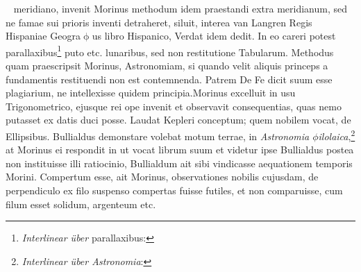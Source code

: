 \rightmoon\  meridiano\protect{}, invenit Morinus\protect{} methodum idem praestandi extra meridianum\protect{}, sed ne famae sui prioris inventi detraheret, siluit, interea  van Langren\protect{} Regis Hispaniae\protect{} Geogra$\upphi$us libro Hispanico, Verdat  idem dedit. In eo careri potest parallaxibus\protect{}\footnote{\textit{Interlinear \"{u}ber} parallaxibus: \Denarius} puto etc. lunaribus, sed non restitutione Tabularum. Methodus quam praescripsit Morinus\protect{}, Astronomiam, si quando velit aliquis princeps a fundamentis restituendi non est contemnenda. Patrem De Fe\protect{} dicit suum esse plagiarium, ne intellexisse quidem principia.\pend \pstart Morinus\protect{} excelluit in usu Trigonometrico, ejusque rei ope invenit et observavit consequentias, quas nemo putasset ex datis duci posse. Laudat Kepleri\protect{} conceptum; quem nobilem vocat, de Ellipsibus. Bullialdus\protect{} demonstare volebat motum terrae, in \textit{Astronomia $\phi$ilolaica},\footnote{\textit{Interlinear \"{u}ber Astronomia}: \Denarius} at Morinus\protect{} ei respondit in  ut vocat librum suum et videtur ipse Bullialdus\protect{} postea non instituisse illi ratiocinio, Bullialdum\protect{} ait sibi vindicasse aequationem temporis Morini\protect{}. Compertum esse, ait Morinus\protect{}, observationes nobilis cujusdam, de perpendiculo ex filo  suspenso compertas fuisse futiles, et non comparuisse, cum filum esset solidum, argenteum etc.\pend 
